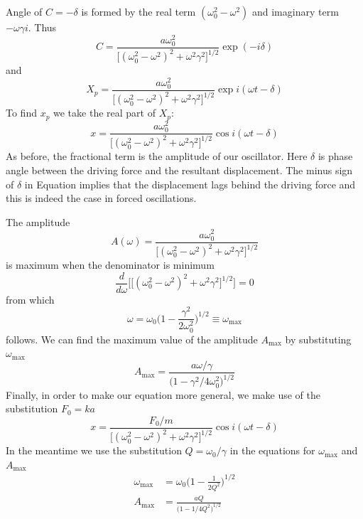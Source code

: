 \documentclass[../../main.tex]{subfiles}
\begin{document}
Angle of $C=-\delta$ is formed by the real term $(\omega_0^2-\omega^2)$ and imaginary term $-\omega\gamma i$. Thus
\begin{equation*}
    C=\frac{a\omega_0^2 }{\big[(\omega_0^2- \omega^2)^2 +\omega^2\gamma^2\big]^{1/2} }\exp (-i\delta )
\end{equation*}
and 
\begin{equation*}
    X_p=\frac{a\omega_0^2 }{\big[(\omega_0^2- \omega^2)^2 +\omega^2\gamma^2\big]^{1/2} }\exp i(\omega t-\delta )
\end{equation*}
To find $x_p$ we take the real part of $X_p$:
\begin{equation*}
    x=\frac{a\omega_0^2 }{\big[(\omega_0^2- \omega^2)^2 +\omega^2\gamma^2\big]^{1/2} }\cos i(\omega t-\delta )
\end{equation*}
As before, the fractional term is the amplitude of our oscillator. Here $\delta $ is phase angle between the driving force and the resultant displacement. The minus sign of $\delta $ in Equation implies that the displacement lags behind the driving force and this is indeed the case in forced oscillations. 

The amplitude
\begin{equation*}
    A(\omega)=\frac{a\omega_0^2 }{\big[(\omega_0^2- \omega^2)^2 +\omega^2\gamma^2\big]^{1/2} }
\end{equation*}
is maximum when the denominator is minimum
\begin{equation*}
    \frac{d}{d\omega}\biggl[\big[(\omega_0^2- \omega^2)^2 +\omega^2\gamma^2\big]^{1/2} \biggr]= 0
\end{equation*}
from which 
\begin{equation*}
    \omega=\omega_0\bigg(1-\frac{\gamma^2}{2\omega_0^2}\bigg)^{1/2}\equiv\omega_{\text{max}}
\end{equation*}
follows. We can find the maximum value of the amplitude $A_{\text{max}}$ by substituting $\omega_{\text{max}}$
\begin{equation*}
    A_{\text{max}}=\frac{a\omega/\gamma}{\big(1-\gamma^2/4\omega_0^2 \big)^{1/2}}
\end{equation*}
Finally, in order to make our equation more general, we make use of the substitution $F_0 = ka$
\begin{equation*}
    x=\frac{F_0/m }{\big[(\omega_0^2- \omega^2)^2 +\omega^2\gamma^2\big]^{1/2} }\cos i(\omega t-\delta )
\end{equation*}
In the meantime we use the substitution $Q = \omega_0/\gamma$ in the equations for $\omega_{\text{max}}$ and $A_{\text{max}}$
\begin{align*}
    \omega_{\text{max}}&=\omega_0\bigg(1-\frac{1}{2Q^2}\bigg)^{1/2}\\
    A_{\text{max}}&=\frac{aQ}{\big(1-1/4Q^2 \big)^{1/2}}
\end{align*}
\end{document}
